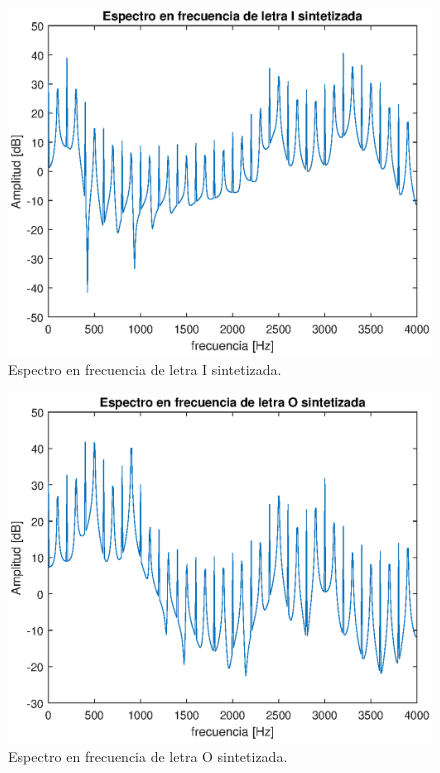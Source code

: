 \begin{figure}[H]
    \centering
    \includegraphics[width = .8\linewidth]{figures/p1_3i.eps}
    \caption{Espectro en frecuencia de letra I sintetizada.}
    \label{fig:p1_3i}
\end{figure}

\begin{figure}[H]
    \centering
    \includegraphics[width = .8\linewidth]{figures/p1_3o.eps}
    \caption{Espectro en frecuencia de letra O sintetizada.}
    \label{fig:p1_3o}
\end{figure}

